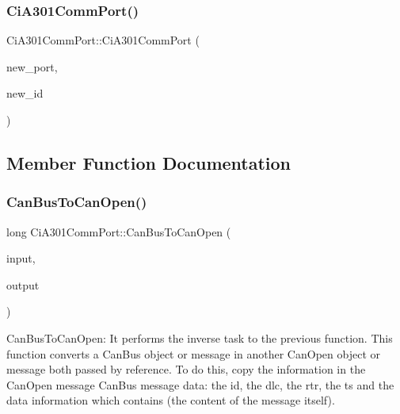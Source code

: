 \mbox{\label{classCiA301CommPort_a1e05c4b292cfee36ff9eeddb2c8eb4c0}} 
\subsubsection{\texorpdfstring{Ci\+A301\+Comm\+Port()}{CiA301CommPort()}\hspace{0.1cm}{\footnotesize\ttfamily [2/2]}}
{\footnotesize\ttfamily Ci\+A301\+Comm\+Port\+::\+Ci\+A301\+Comm\+Port (\begin{DoxyParamCaption}\item[{\hyperlink{classPortBase}{Port\+Base} $\ast$}]{new\+\_\+port,  }\item[{uint8\+\_\+t}]{new\+\_\+id }\end{DoxyParamCaption})}



\subsection{Member Function Documentation}
\mbox{\label{classCiA301CommPort_aa16887712ea9cad534aacd4851f9190d}} 
\subsubsection{\texorpdfstring{Can\+Bus\+To\+Can\+Open()}{CanBusToCanOpen()}}
{\footnotesize\ttfamily long Ci\+A301\+Comm\+Port\+::\+Can\+Bus\+To\+Can\+Open (\begin{DoxyParamCaption}\item[{const \hyperlink{structcan__msg}{can\+\_\+msg} \&}]{input,  }\item[{\hyperlink{structco__msg}{co\+\_\+msg} \&}]{output }\end{DoxyParamCaption})\hspace{0.3cm}{\ttfamily [private]}}



Can\+Bus\+To\+Can\+Open\+: It performs the inverse task to the previous function. This function converts a Can\+Bus object or message in another Can\+Open object or message both passed by reference. To do this, copy the information in the Can\+Open message Can\+Bus message data\+: the id, the dlc, the rtr, the ts and the data information which contains (the content of the message itself). 


